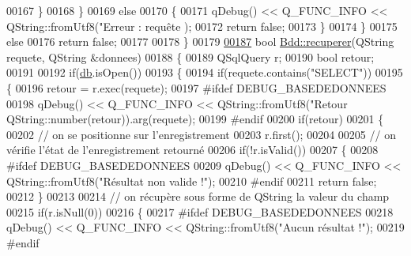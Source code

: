 \begin{DoxyCode}
{{{00167             \}
00168         \}
00169         \textcolor{keywordflow}{else}
00170         \{
00171             qDebug() << Q\_FUNC\_INFO << QString::fromUtf8(\textcolor{stringliteral}{"Erreur : requête %
      );
00172             \textcolor{keywordflow}{return} \textcolor{keyword}{false};
00173         \}
00174     \}
00175     \textcolor{keywordflow}{else}
00176         \textcolor{keywordflow}{return} \textcolor{keyword}{false};
00177 
00178 \}
00179 
\hyperlink{class_bdd_a8f25d29d309041bbf875700db0efd97b}{00187} \textcolor{keywordtype}{bool} \hyperlink{class_bdd_a8f25d29d309041bbf875700db0efd97b}{Bdd::recuperer}(QString requete, QString &donnees)
00188 \{
00189     QSqlQuery r;
00190     \textcolor{keywordtype}{bool} retour;
00191 
00192     \textcolor{keywordflow}{if}(\hyperlink{class_bdd_a8628c1686deda86999f86689c3e7268e}{db}.isOpen())
00193     \{
00194         \textcolor{keywordflow}{if}(requete.contains(\textcolor{stringliteral}{"SELECT"}))
00195         \{
00196             retour = r.exec(requete);
00197 \textcolor{preprocessor}{            #ifdef DEBUG\_BASEDEDONNEES}
00198             qDebug() << Q\_FUNC\_INFO << QString::fromUtf8(\textcolor{stringliteral}{"Retour %
      QString::number(retour)).arg(requete);
00199 \textcolor{preprocessor}{            #endif}
00200             \textcolor{keywordflow}{if}(retour)
00201             \{
00202                 \textcolor{comment}{// on se positionne sur l'enregistrement}
00203                 r.first();
00204 
00205                 \textcolor{comment}{// on vérifie l'état de l'enregistrement retourné}
00206                 \textcolor{keywordflow}{if}(!r.isValid())
00207                 \{
00208 \textcolor{preprocessor}{                    #ifdef DEBUG\_BASEDEDONNEES}
00209                     qDebug() << Q\_FUNC\_INFO << QString::fromUtf8(\textcolor{stringliteral}{"Résultat non valide !"});
00210 \textcolor{preprocessor}{                    #endif}
00211                     \textcolor{keywordflow}{return} \textcolor{keyword}{false};
00212                 \}
00213 
00214                 \textcolor{comment}{// on récupère sous forme de QString la valeur du champ}
00215                 \textcolor{keywordflow}{if}(r.isNull(0))
00216                 \{
00217 \textcolor{preprocessor}{                    #ifdef DEBUG\_BASEDEDONNEES}
00218                     qDebug() << Q\_FUNC\_INFO << QString::fromUtf8(\textcolor{stringliteral}{"Aucun résultat !"});
00219 \textcolor{preprocessor}{                    #endif}
}}}}}
\end{DoxyCode}
